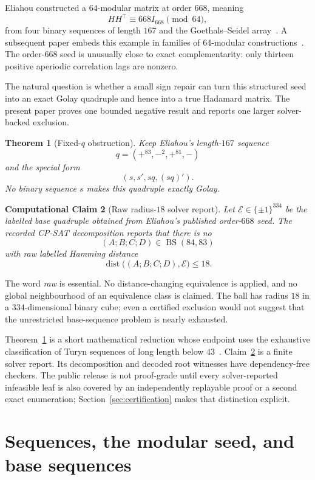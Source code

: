 \documentclass[11pt]{article}
\newtheorem{theorem}{Theorem}
\newtheorem{computationalclaim}[theorem]{Computational Claim}
\newcommand{\BS}{\operatorname{BS}}
\newcommand{\dist}{\operatorname{dist}}
\begin{document}
Eliahou constructed a $64$-modular matrix at order $668$, meaning
\[
 HH^\top\equiv668I_{668}\pmod {64},
\]
from four binary sequences of length $167$ and the Goethals--Seidel
array~\cite{eliahou-2025}.  A subsequent paper embeds this example in
families of 64-modular constructions~\cite{eliahou-2026}.  The order-$668$
seed is unusually close to exact complementarity: only thirteen positive
aperiodic correlation lags are nonzero.

The natural question is whether a small sign repair can turn this structured
seed into an exact Golay quadruple and hence into a true Hadamard matrix.  The
present paper proves one bounded negative result and reports one larger
solver-backed exclusion.

\begin{theorem}[Fixed-$q$ obstruction]\label{thm:fixedq}
Keep Eliahou's length-$167$ sequence
\[
 q=(+^{83},-^2,+^{81},-)
\]
and the special form
\[
 (s,s',sq,(sq)').
\]
No binary sequence $s$ makes this quadruple exactly Golay.
\end{theorem}

\begin{computationalclaim}[Raw radius-$18$ solver report]\label{thm:radius}
Let $\mathcal E\in\{\pm1\}^{334}$ be the labelled base quadruple obtained
from Eliahou's published order-$668$ seed.  The recorded CP-SAT decomposition
reports that there is no
\[
 (A;B;C;D)\in\BS(84,83)
\]
with raw labelled Hamming distance
\[
 \dist\bigl((A;B;C;D),\mathcal E\bigr)\le18.
\]
\end{computationalclaim}

The word \emph{raw} is essential.  No distance-changing equivalence is
applied, and no global neighbourhood of an equivalence class is claimed.
The ball has radius $18$ in a $334$-dimensional binary cube; even a certified
exclusion would not suggest that the unrestricted base-sequence problem is
nearly exhausted.

Theorem~\ref{thm:fixedq} is a short mathematical reduction whose endpoint
uses the exhaustive classification of Turyn sequences of long length below
$43$~\cite{edmondson}.  Claim~\ref{thm:radius} is a finite solver report.
Its decomposition and decoded root witnesses have dependency-free
checkers.  The public release is not proof-grade until every solver-reported
infeasible leaf is also covered by an independently replayable proof or a
second exact enumeration; Section~\ref{sec:certification} makes that
distinction explicit.

\section{Sequences, the modular seed, and base sequences}
\end{document}
